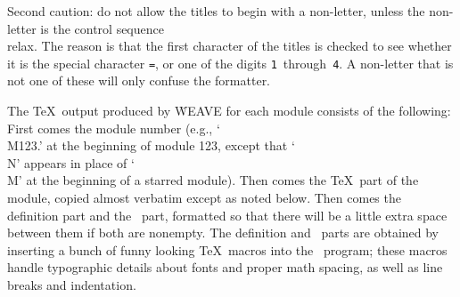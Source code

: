 \newstuff
Second caution:
do not allow the titles to begin with a non-letter, unless the
non-letter is the control sequence \.{\\relax}.
The reason is that the first character of the titles is checked to see
whether it is the special character {\tt =}, or one of the
digits {\tt 1}~through~{\tt 4}.
A non-letter that is not one of these will only confuse the formatter.
\endnewstuff

The \TeX\ output produced by \.{WEAVE} for each module consists of
the following: First comes the module number (e.g., `\.{\\M123.}'
at the beginning of module 123, except that `\.{\\N}' appears in place of
`\.{\\M}' at the beginning of a starred module).
Then comes the
\TeX\ part of the module, copied almost verbatim except as noted
below.
Then comes the definition part and the \PASCAL\ part, formatted
so that there will be a little extra space between them if both are
nonempty.
The definition and \PASCAL\ parts are obtained by inserting
a bunch of funny looking \TeX\ macros into the \PASCAL\ program; these
macros handle typographic details about fonts and proper math spacing,
as well as line breaks and indentation.

